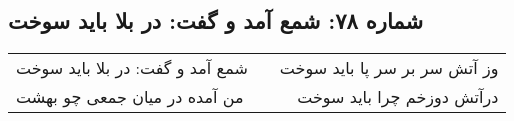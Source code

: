 \begin{center}
\section*{شماره ۷۸: شمع آمد و گفت: در بلا باید سوخت}
\label{sec:078}
\begin{longtable}{l p{0.5cm} r}
شمع آمد و گفت: در بلا باید سوخت
&&
وز آتش سر بر سر پا باید سوخت
\\
من آمده در میان جمعی چو بهشت
&&
درآتش دوزخم چرا باید سوخت
\\
\end{longtable}
\end{center}
